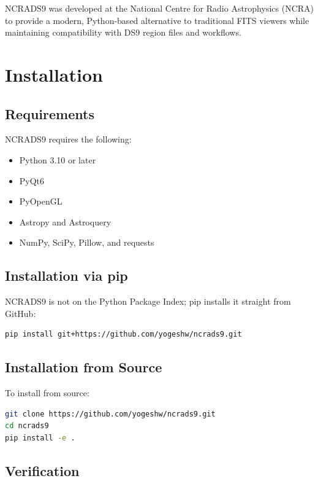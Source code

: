 \documentclass[11pt,a4paper]{report}
\begin{document}
NCRADS9 was developed at the National Centre for Radio Astrophysics (NCRA) to provide a modern, Python-based alternative to traditional FITS viewers while maintaining compatibility with DS9 region files and workflows.

\chapter{Installation}

\section{Requirements}

NCRADS9 requires the following:

\begin{itemize}
    \item Python 3.10 or later
    \item PyQt6
    \item PyOpenGL
    \item Astropy and Astroquery
    \item NumPy, SciPy, Pillow, and requests
\end{itemize}

\section{Installation via pip}

NCRADS9 is not on the Python Package Index; pip installs it straight from GitHub:

\begin{lstlisting}[language=bash]
pip install git+https://github.com/yogeshw/ncrads9.git
\end{lstlisting}

\section{Installation from Source}

To install from source:

\begin{lstlisting}[language=bash]
git clone https://github.com/yogeshw/ncrads9.git
cd ncrads9
pip install -e .
\end{lstlisting}

\section{Verification}
\end{document}
